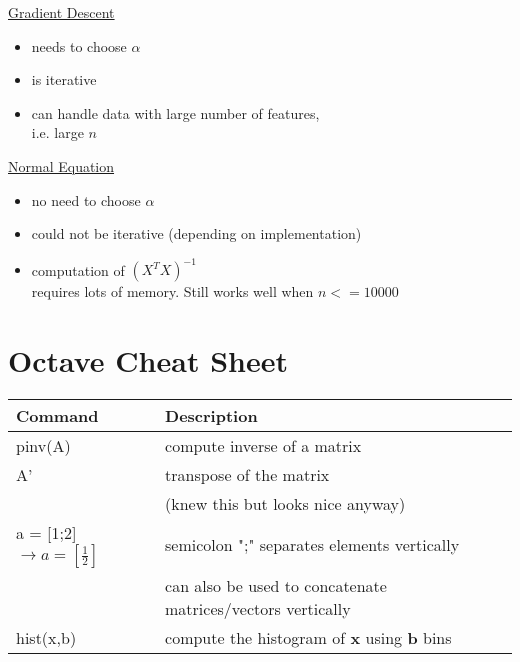 \documentclass[11pt,a4paper]{article}
\begin{document}
\begin{multicols}{2}
\underline{Gradient Descent}
\begin{itemize}
\item needs to choose $\alpha$
\item is iterative
\item can handle data with large number of features,\\ i.e. large $n$
\end{itemize}

\columnbreak
\underline{Normal Equation}\\
\begin{itemize}
\item no need to choose $\alpha$
\item could not be iterative (depending on implementation)
\item computation of $(X^TX)^{-1}$\\ requires lots of memory. Still works well when $n <= 10000$
\end{itemize}
\end{multicols}


\section*{Octave Cheat Sheet}
\begin{tabular}{l|l}
\textbf{Command}&\textbf{Description}\\
\hline
pinv(A)&compute inverse of a matrix\\
\hline
A'&transpose of the matrix\\
&(knew this but looks nice anyway)\\
\hline
a = [1;2] $\rightarrow a=[\frac{1}{2}]$& semicolon ";" separates elements vertically\\
&can also be used to concatenate matrices/vectors vertically\\
\hline
hist(x,b)&compute the histogram of \textbf{x} using \textbf{b} bins\\
\hline
\end{tabular}
\end{document}
